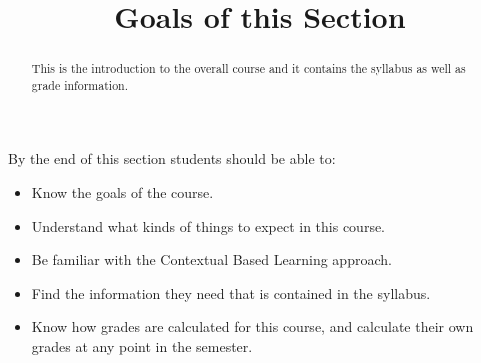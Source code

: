 \documentclass{ximera}
\title{Goals of this Section}
\begin{document}
\begin{abstract}
This is the introduction to the overall course and it contains the syllabus as well as grade information.
\end{abstract}
\maketitle
By the end of this section students should be able to:

\begin{itemize}
    \item Know the goals of the course.
    \item Understand what kinds of things to expect in this course.
    \item Be familiar with the Contextual Based Learning approach.
    \item Find the information they need that is contained in the syllabus.
    \item Know how grades are calculated for this course, and calculate their own grades at any point in the semester.
\end{itemize}
\end{document}
